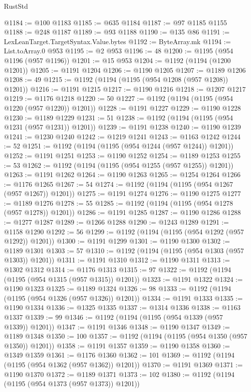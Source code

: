 \begin{lexlean}{RustStd}
\begin{coremodule}
@1184 := @100 @1183
@1185 := @635 @1184
@1187 := @97 @1185 @1155
@1188 := @248 @1187
@1189 := @93 @1188
@1190 := @135 @86
@1191 := LexLeanTarget.TargetSyntax.Value.bytes
@1192 := ByteArray.mk
@1194 := List.toArray.{0} @953
@1195 := @2 @953
@1196 := 48
@1200 := @1195 (@954 @1196 (@957 @1196))
@1201 := @15 @953
@1204 := @1192 (@1194 (@1200 @1201))
@1205 := @1191 @1204
@1206 := @1190 @1205
@1207 := @1189 @1206
@1208 := 49
@1215 := @1192 (@1194 (@1195 (@954 @1208 (@957 @1208)) @1201))
@1216 := @1191 @1215
@1217 := @1190 @1216
@1218 := @1207 @1217
@1219 := @1176 @1218
@1220 := 50
@1227 := @1192 (@1194 (@1195 (@954 @1220 (@957 @1220)) @1201))
@1228 := @1191 @1227
@1229 := @1190 @1228
@1230 := @1189 @1229
@1231 := 51
@1238 := @1192 (@1194 (@1195 (@954 @1231 (@957 @1231)) @1201))
@1239 := @1191 @1238
@1240 := @1190 @1239
@1241 := @1230 @1240
@1242 := @1219 @1241
@1243 := @1163 @1242
@1244 := 52
@1251 := @1192 (@1194 (@1195 (@954 @1244 (@957 @1244)) @1201))
@1252 := @1191 @1251
@1253 := @1190 @1252
@1254 := @1189 @1253
@1255 := 53
@1262 := @1192 (@1194 (@1195 (@954 @1255 (@957 @1255)) @1201))
@1263 := @1191 @1262
@1264 := @1190 @1263
@1265 := @1254 @1264
@1266 := @1176 @1265
@1267 := 54
@1274 := @1192 (@1194 (@1195 (@954 @1267 (@957 @1267)) @1201))
@1275 := @1191 @1274
@1276 := @1190 @1275
@1277 := @1189 @1276
@1278 := 55
@1285 := @1192 (@1194 (@1195 (@954 @1278 (@957 @1278)) @1201))
@1286 := @1191 @1285
@1287 := @1190 @1286
@1288 := @1277 @1287
@1289 := @1266 @1288
@1290 := @1243 @1289
@1291 := @1158 @1290
@1292 := 56
@1299 := @1192 (@1194 (@1195 (@954 @1292 (@957 @1292)) @1201))
@1300 := @1191 @1299
@1301 := @1190 @1300
@1302 := @1189 @1301
@1303 := 57
@1310 := @1192 (@1194 (@1195 (@954 @1303 (@957 @1303)) @1201))
@1311 := @1191 @1310
@1312 := @1190 @1311
@1313 := @1302 @1312
@1314 := @1176 @1313
@1315 := 97
@1322 := @1192 (@1194 (@1195 (@954 @1315 (@957 @1315)) @1201))
@1323 := @1191 @1322
@1324 := @1190 @1323
@1325 := @1189 @1324
@1326 := 98
@1333 := @1192 (@1194 (@1195 (@954 @1326 (@957 @1326)) @1201))
@1334 := @1191 @1333
@1335 := @1190 @1334
@1336 := @1325 @1335
@1337 := @1314 @1336
@1338 := @1163 @1337
@1339 := 99
@1346 := @1192 (@1194 (@1195 (@954 @1339 (@957 @1339)) @1201))
@1347 := @1191 @1346
@1348 := @1190 @1347
@1349 := @1189 @1348
@1350 := 100
@1357 := @1192 (@1194 (@1195 (@954 @1350 (@957 @1350)) @1201))
@1358 := @1191 @1357
@1359 := @1190 @1358
@1360 := @1349 @1359
@1361 := @1176 @1360
@1362 := 101
@1369 := @1192 (@1194 (@1195 (@954 @1362 (@957 @1362)) @1201))
@1370 := @1191 @1369
@1371 := @1190 @1370
@1372 := @1189 @1371
@1373 := 102
@1380 := @1192 (@1194 (@1195 (@954 @1373 (@957 @1373)) @1201))

\end{coremodule}
\end{lexlean}
